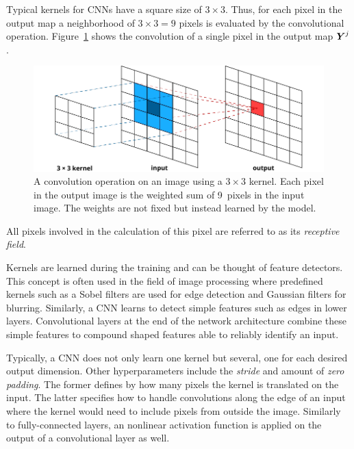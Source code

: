 Typical kernels for CNNs have a square size of $3 \times 3$. Thus, for each pixel in the output map a neighborhood of $3 \times 3 = 9$ pixels is evaluated by the convolutional operation.  Figure~\ref{fig:convolution} shows the convolution of a single pixel in the output map $\boldsymbol{Y}^{j}$.
	\begin{figure}[tp]
  		\centering
    	\includegraphics{img/convolution.pdf}
    	\caption{A convolution operation on an image using a $3 \times 3$ kernel. Each pixel in the output image is the weighted sum of \num{9}~pixels in the input image. The weights are not fixed but instead learned by the model.}
    	\label{fig:convolution}
	\end{figure}
	All pixels involved in the calculation of this pixel are referred to as its \emph{receptive field}. 

Kernels are learned during the training and can be thought of feature detectors. This concept is often used in the field of image processing where predefined kernels such as a Sobel filters are used for edge detection and Gaussian filters for blurring. Similarly, a CNN learns to detect simple features such as edges in lower layers. Convolutional layers at the end of the network architecture combine these simple  features to compound shaped features able to reliably identify an input. 

Typically, a CNN does not only learn one kernel but several, one for each desired output dimension. Other hyperparameters include the \emph{stride} and amount of \emph{zero padding}. The former defines by how many pixels the kernel is translated on the input. The latter specifies how to handle convolutions along the edge of an input where the kernel would need to include pixels from outside the image. Similarly to fully-connected layers, an nonlinear activation function is applied on the output of a convolutional layer as well.  

